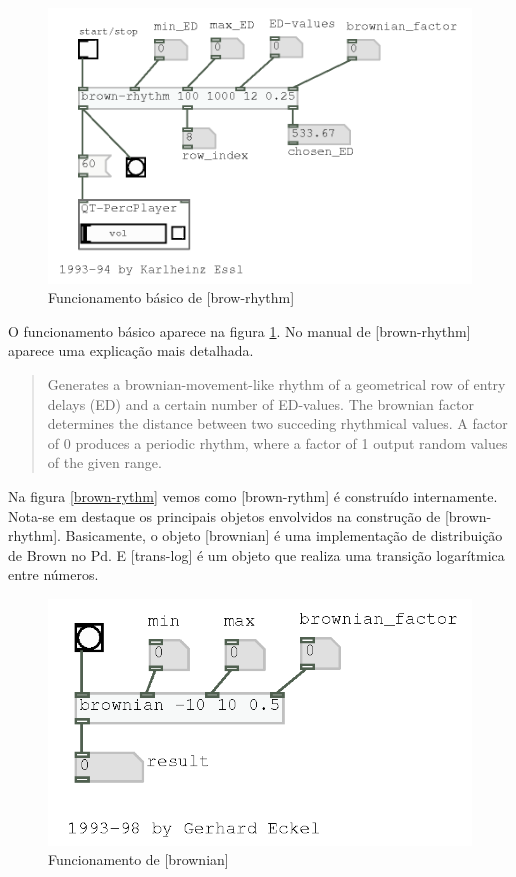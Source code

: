 \documentclass{ppgmus}
\begin{document}
 \begin{figure}
\includegraphics[scale=.6]{brown-rhythm-func}
\caption{Funcionamento básico de [brow-rhythm]}
\label{brown-rythm-func}
\end{figure} 


O funcionamento básico aparece na figura \ref{brown-rythm-func}.
No manual de [brown-rhythm] aparece uma explicação mais detalhada.


\begin{quote}
Generates a brownian-movement-like rhythm of a geometrical row of
entry delays (ED) and a certain number of ED-values. The brownian factor
determines the distance between two succeding rhythmical values. A factor
of 0 produces a periodic rhythm, where a factor of 1 output random values 
of the given range.
\end{quote}  



Na figura \ref{brown-rythm} vemos como [brown-rythm] é construído internamente.
Nota-se em destaque os principais objetos envolvidos na construção
de [brown-rhythm]. Basicamente, o objeto [brownian] é uma implementação de
distribuição de Brown no Pd. E [trans-log] é um objeto que realiza uma
transição logarítmica entre números.

 \begin{figure}
\includegraphics[scale=.6]{brownian-func}
\caption{Funcionamento de [brownian]}
\label{brownian-func}
\end{figure} 
\end{document}
